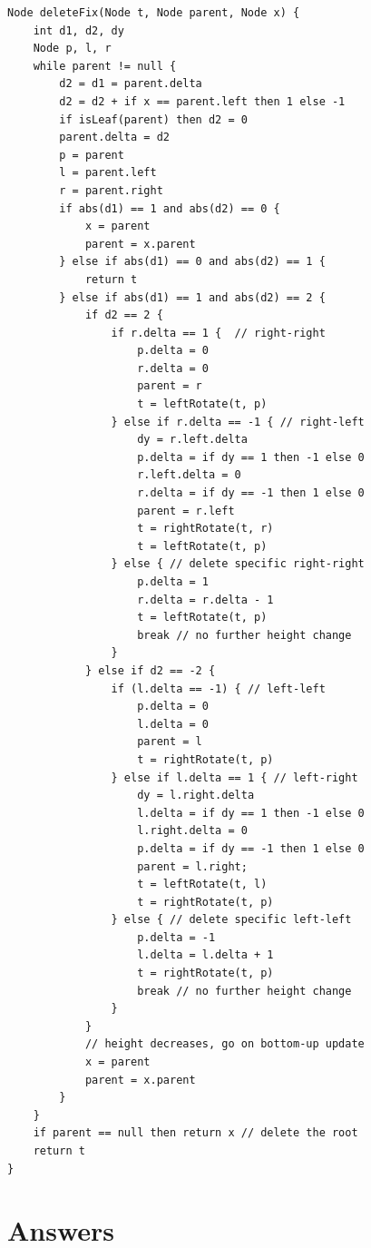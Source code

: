 \documentclass[b5paper]{article}
\begin{document}
\begin{lstlisting}[language = Bourbaki]
Node deleteFix(Node t, Node parent, Node x) {
    int d1, d2, dy
    Node p, l, r
    while parent != null {
        d2 = d1 = parent.delta
        d2 = d2 + if x == parent.left then 1 else -1
        if isLeaf(parent) then d2 = 0
        parent.delta = d2
        p = parent
        l = parent.left
        r = parent.right
        if abs(d1) == 1 and abs(d2) == 0 {
            x = parent
            parent = x.parent
        } else if abs(d1) == 0 and abs(d2) == 1 {
            return t
        } else if abs(d1) == 1 and abs(d2) == 2 {
            if d2 == 2 {
                if r.delta == 1 {  // right-right
                    p.delta = 0
                    r.delta = 0
                    parent = r
                    t = leftRotate(t, p)
                } else if r.delta == -1 { // right-left
                    dy = r.left.delta
                    p.delta = if dy == 1 then -1 else 0
                    r.left.delta = 0
                    r.delta = if dy == -1 then 1 else 0
                    parent = r.left
                    t = rightRotate(t, r)
                    t = leftRotate(t, p)
                } else { // delete specific right-right
                    p.delta = 1
                    r.delta = r.delta - 1
                    t = leftRotate(t, p)
                    break // no further height change
                }
            } else if d2 == -2 {
                if (l.delta == -1) { // left-left
                    p.delta = 0
                    l.delta = 0
                    parent = l
                    t = rightRotate(t, p)
                } else if l.delta == 1 { // left-right
                    dy = l.right.delta
                    l.delta = if dy == 1 then -1 else 0
                    l.right.delta = 0
                    p.delta = if dy == -1 then 1 else 0
                    parent = l.right;
                    t = leftRotate(t, l)
                    t = rightRotate(t, p)
                } else { // delete specific left-left
                    p.delta = -1
                    l.delta = l.delta + 1
                    t = rightRotate(t, p)
                    break // no further height change
                }
            }
            // height decreases, go on bottom-up update
            x = parent
            parent = x.parent
        }
    }
    if parent == null then return x // delete the root
    return t
}
\end{lstlisting}

\ifx\wholebook\relax \else
\section{Answers}
\shipoutAnswer




\expandafter\enddocument
\fi
\end{document}
